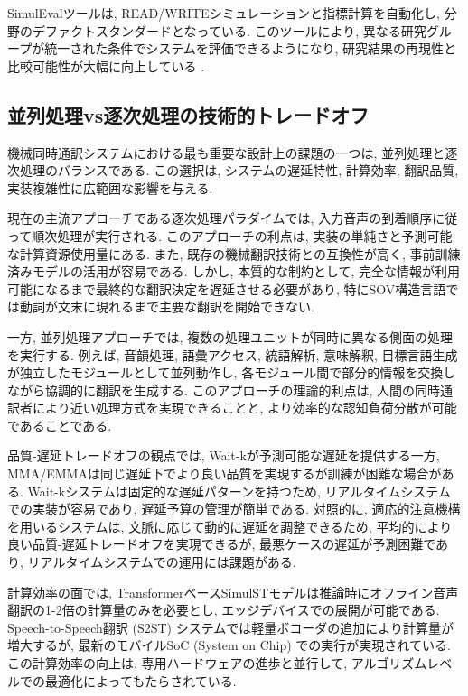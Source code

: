 SimulEvalツールは, READ/WRITEシミュレーションと指標計算を自動化し, 分野のデファクトスタンダードとなっている.
このツールにより, 異なる研究グループが統一された条件でシステムを評価できるようになり, 研究結果の再現性と比較可能性が大幅に向上している \cite{ma2020simuleval}.

\subsection{並列処理vs逐次処理の技術的トレードオフ}

機械同時通訳システムにおける最も重要な設計上の課題の一つは, 並列処理と逐次処理のバランスである.
この選択は, システムの遅延特性, 計算効率, 翻訳品質, 実装複雑性に広範囲な影響を与える.

現在の主流アプローチである逐次処理パラダイムでは, 入力音声の到着順序に従って順次処理が実行される.
このアプローチの利点は, 実装の単純さと予測可能な計算資源使用量にある.
また, 既存の機械翻訳技術との互換性が高く, 事前訓練済みモデルの活用が容易である.
しかし, 本質的な制約として, 完全な情報が利用可能になるまで最終的な翻訳決定を遅延させる必要があり, 特にSOV構造言語では動詞が文末に現れるまで主要な翻訳を開始できない.

一方, 並列処理アプローチでは, 複数の処理ユニットが同時に異なる側面の処理を実行する.
例えば, 音韻処理, 語彙アクセス, 統語解析, 意味解釈, 目標言語生成が独立したモジュールとして並列動作し, 各モジュール間で部分的情報を交換しながら協調的に翻訳を生成する.
このアプローチの理論的利点は, 人間の同時通訳者により近い処理方式を実現できることと, より効率的な認知負荷分散が可能であることである.

品質-遅延トレードオフの観点では, Wait-kが予測可能な遅延を提供する一方, MMA/EMMAは同じ遅延下でより良い品質を実現するが訓練が困難な場合がある.
Wait-kシステムは固定的な遅延パターンを持つため, リアルタイムシステムでの実装が容易であり, 遅延予算の管理が簡単である.
対照的に, 適応的注意機構を用いるシステムは, 文脈に応じて動的に遅延を調整できるため, 平均的により良い品質-遅延トレードオフを実現できるが, 最悪ケースの遅延が予測困難であり, リアルタイムシステムでの運用には課題がある.

計算効率の面では, TransformerベースSimulSTモデルは推論時にオフライン音声翻訳の1-2倍の計算量のみを必要とし, エッジデバイスでの展開が可能である.
Speech-to-Speech翻訳 (S2ST) システムでは軽量ボコーダの追加により計算量が増大するが, 最新のモバイルSoC (System on Chip) での実行が実現されている.
この計算効率の向上は, 専用ハードウェアの進歩と並行して, アルゴリズムレベルでの最適化によってもたらされている.

